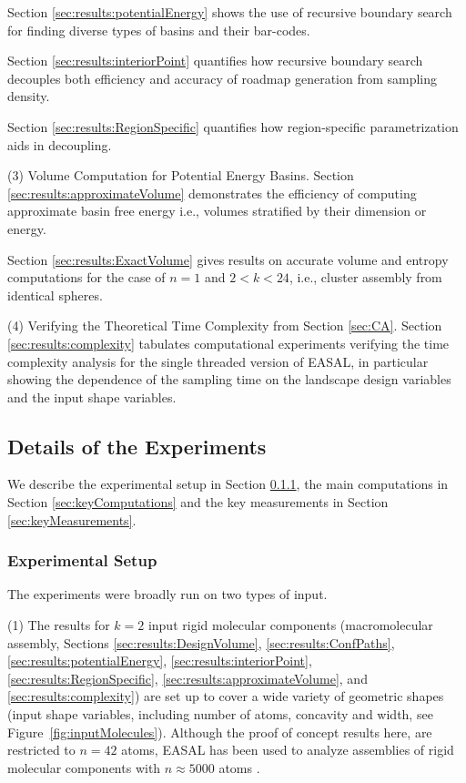 \documentclass[]{article}
\newcommand{\figref}[1]{Figure~\ref{#1}}
\newcommand{\rmc}{rigid molecular component}
\begin{document}
Section
\ref{sec:results:potentialEnergy} shows the use of recursive boundary search
for finding diverse types of basins and their bar-codes.

Section
\ref{sec:results:interiorPoint} quantifies how recursive boundary search
decouples both efficiency and accuracy of roadmap generation from sampling
density.

Section \ref{sec:results:RegionSpecific} quantifies how
region-specific parametrization aids in decoupling.

(3) Volume Computation for Potential Energy Basins. Section
\ref{sec:results:approximateVolume} 
demonstrates the efficiency of computing approximate basin free energy
i.e., volumes stratified by their dimension or energy.

Section
\ref{sec:results:ExactVolume} gives results on accurate volume and entropy
computations for the case of $n=1$ and $2<k<24$, i.e., cluster assembly from
identical spheres.

(4) Verifying the Theoretical Time Complexity from Section \ref{sec:CA}.
Section \ref{sec:results:complexity} tabulates computational experiments
verifying the time complexity analysis for the single threaded version of
EASAL, in particular showing the dependence of the sampling time on the 
landscape design variables and the input shape variables.


\subsection{Details of the Experiments}
We describe the experimental setup in Section \ref{sec:expSetup},
the main computations in Section \ref{sec:keyComputations} and the key measurements
in Section \ref{sec:keyMeasurements}.

\subsubsection{Experimental Setup}
\label{sec:expSetup}
The experiments were broadly run on two types of input.

(1) The results for $k=2$ input \rmc s (macromolecular assembly,
Sections
\ref{sec:results:DesignVolume}, \ref{sec:results:ConfPaths},
\ref{sec:results:potentialEnergy}, 
\ref{sec:results:interiorPoint}, \ref{sec:results:RegionSpecific},
\ref{sec:results:approximateVolume}, and \ref{sec:results:complexity}) are set
up to cover a wide variety of geometric shapes (input shape variables,
including number of atoms, concavity and width, see
\figref{fig:inputMolecules}).  Although the proof of concept results here, are
restricted to $n=42$ atoms, EASAL has been used to analyze assemblies of \rmc s
with $n\approx 5000$ atoms \cite{Wu2012}.
\end{document}
